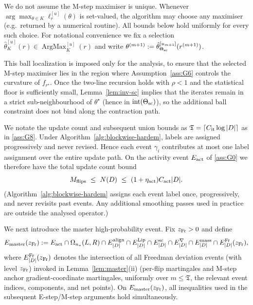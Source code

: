 \documentclass{statsoc}
\newcommand{\1}{\mathbbm{1}}
\newcommand{\Tmax}{\mathfrak{T}}
\begin{document}
We do not assume the M-step maximiser is unique. Whenever $\arg\max_{\theta\in K}\ell_r^{[u]}(\theta)$ is set-valued, the algorithm may choose any maximiser (e.g.\ returned by a numerical routine). All bounds below hold uniformly for
every such choice. For notational convenience we fix a selection $\hat\theta_K^{[u]}(r)\in\operatorname{ArgMax}_K^{[u]}(r)$ and write $\theta^{(m+1)}:=\hat\theta_{\Theta_{\rm sc}}^{[u_{m+1}]}(r^{(m+1)})$.

This ball localization is imposed only for the analysis, to ensure that the selected M-step maximiser lies in the region where Assumption~\ref{ass:G6} controls the curvature of $f_{r^\star}$. Once the two-line recursion holds with $\rho<1$ and the statistical floor is sufficiently small, Lemma~\ref{lem:inv-sc} implies that the iterates remain in a strict sub-neighbourhood of $\theta^\star$ (hence in $\operatorname{int}(\Theta_{\rm sc})$), so the additional ball constraint does not bind along the contraction path.


We notate the update count and subsequent union bounds as $\Tmax=\lceil C_{\rm it}\log|D|\rceil$ as in \cref{ass:G8}. Under Algorithm~\ref{alg:blockwise-hardem}, labels are assigned progressively and never revised.
Hence each event $\gamma_i$ contributes at most one label assignment over the entire update path.
On the activity event $E_{\rm act}$ of \cref{ass:G0} we therefore have the total update count bound
\begin{equation}\label{eq:flipcount}
M_{\rm flips}\ \le\ N(D)\ \le\ (1+\eta_{\rm act}) C_{\rm act} |D|.
\end{equation}
(Algorithm~\ref{alg:blockwise-hardem} assigns each event label once, progressively, and never revisits past events. Any additional smoothing passes used in practice are outside the analysed operator.)


We next introduce the master high-probability event.
Fix $z_{\rm Fr}>0$ and define
\[
E_{\mathrm{master}}(z_{\rm Fr})
:=E_{\rm act}\cap \Omega_{n_*}(L,R)\cap E^{\rm align}_{|D|}
\cap E^{\rm Lip}_{|D|}\cap E^{\rm sc}_{|D|}\cap E^{\nabla}_{|D|}\cap E^{\rm mass}_{|D|}
\cap E^{\rm Fr}_{|D|}(z_{\rm Fr}),
\]
where $E^{\rm Fr}_{|D|}(z_{\rm Fr})$ denotes the intersection of all Freedman deviation events (with level $z_{\rm Fr}$)
invoked in Lemma~\ref{lem:master}(ii) (per-flip martingales and M-step anchor gradient-coordinate martingales,
uniformly over $m\le\Tmax$, the relevant event indices, components, and net points).
On $E_{\mathrm{master}}(z_{\rm Fr})$, all inequalities used in the subsequent E-step/M-step arguments hold simultaneously.
\end{document}
